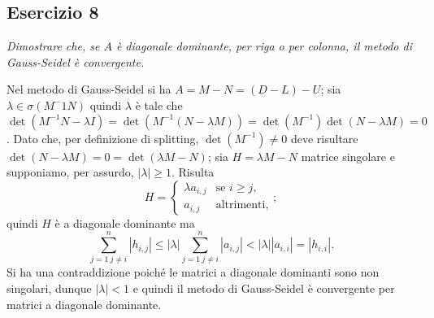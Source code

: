 \subsection{Esercizio 8}
\label{sub:es8}
\emph{Dimostrare che, se $A$ è diagonale dominante, per riga o per colonna, il metodo di Gauss-Seidel è convergente.}
\begin{sol}
  Nel metodo di Gauss-Seidel si ha $A=M-N=(D-L)-U$;
   sia $\lambda\in\sigma(M^-1N)$ quindi $\lambda$ è tale che
   $\det{(M^{-1}N-\lambda I)}=\det{(M^{-1}(N-\lambda M))}=\det{(M^{-1})}\det{(N-\lambda M)}=0$.
   Dato che, per definizione di splitting, $\det{(M^{-1})}\neq 0$ deve risultare
   $\det{(N-\lambda M)}=0=\det{(\lambda M-N)}$; sia $H=\lambda M-N$ matrice singolare e supponiamo, per assurdo,
   $|\lambda|\geq 1$. Risulta $$H=\begin{cases}\lambda a_{i,j}&\mbox{se }i\geq j,\\a_{i,j}&\mbox{altrimenti},\end{cases};$$
   quindi $H$ è a diagonale dominante ma $$\sum_{j=1\: j\neq i}^n{|h_{i,j}|}\leq |\lambda|\sum_{j=1\: j\neq i}^n{|a_{i,j}|}<|\lambda||a_{i,i}|=|h_{i,i}|.$$
   Si ha una contraddizione poiché le matrici a diagonale dominanti sono non singolari,
   dunque $|\lambda|<1$ e quindi il metodo di Gauss-Seidel è convergente per matrici a diagonale dominante.
\end{sol}

